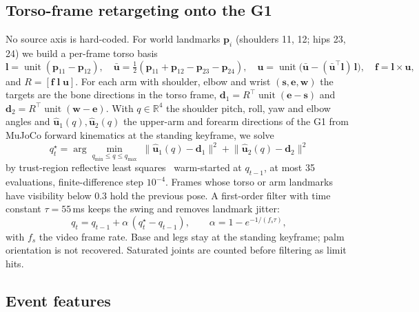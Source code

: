 \documentclass[10pt]{article}
\newcommand{\R}{\mathbb{R}}
\newcommand{\nrm}{\operatorname{unit}}
\begin{document}
\subsection{Torso-frame retargeting onto the G1}
\label{sec:ik}

No source axis is hard-coded. For world landmarks $\mathbf{p}_i$ (shoulders 11, 12; hips 23, 24) we build a per-frame torso basis
\begin{equation}
  \mathbf{l} = \nrm(\mathbf{p}_{11}-\mathbf{p}_{12}), \quad
  \bar{\mathbf{u}} = \tfrac12(\mathbf{p}_{11}+\mathbf{p}_{12}-\mathbf{p}_{23}-\mathbf{p}_{24}), \quad
  \mathbf{u} = \nrm\big(\bar{\mathbf{u}} - (\bar{\mathbf{u}}^{\!\top}\mathbf{l})\,\mathbf{l}\big), \quad
  \mathbf{f} = \mathbf{l}\times\mathbf{u},
  \label{eq:torso}
\end{equation}
and $R=[\mathbf{f}\;\mathbf{l}\;\mathbf{u}]$. For each arm with shoulder, elbow and wrist $(\mathbf{s},\mathbf{e},\mathbf{w})$ the targets are the bone directions in the torso frame, $\mathbf{d}_1 = R^{\!\top}\nrm(\mathbf{e}-\mathbf{s})$ and $\mathbf{d}_2 = R^{\!\top}\nrm(\mathbf{w}-\mathbf{e})$. With $q\in\R^4$ the shoulder pitch, roll, yaw and elbow angles and $\hat{\mathbf{u}}_1(q),\hat{\mathbf{u}}_2(q)$ the upper-arm and forearm directions of the G1 from MuJoCo forward kinematics at the standing keyframe, we solve
\begin{equation}
  q^\star_t = \arg\min_{q_{\min}\le q\le q_{\max}} \;\big\| \hat{\mathbf{u}}_1(q)-\mathbf{d}_1 \big\|^2 + \big\| \hat{\mathbf{u}}_2(q)-\mathbf{d}_2 \big\|^2
  \label{eq:ik}
\end{equation}
by trust-region reflective least squares~\cite{branch1999trf} warm-started at $q_{t-1}$, at most 35 evaluations, finite-difference step $10^{-4}$. Frames whose torso or arm landmarks have visibility below 0.3 hold the previous pose. A first-order filter with time constant $\tau=55$\,ms keeps the swing and removes landmark jitter:
\begin{equation}
  q_t = q_{t-1} + \alpha\,(q^\star_t - q_{t-1}), \qquad \alpha = 1 - e^{-1/(f_s \tau)},
  \label{eq:smooth}
\end{equation}
with $f_s$ the video frame rate. Base and legs stay at the standing keyframe; palm orientation is not recovered. Saturated joints are counted before filtering as limit hits.

\subsection{Event features}
\label{sec:features}
\end{document}
